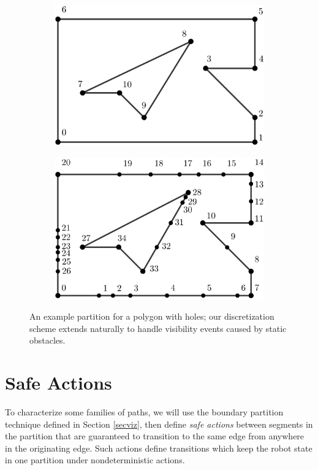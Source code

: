 \documentclass[sageh,times,Review]{sagej}
\begin{document}
\begin{figure}
\begin{subfigure}{0.5\columnwidth}
\centering
\includegraphics[width=0.9\linewidth]{median_holes.eps}
\centering
\end{subfigure}%
\begin{subfigure}{0.5\columnwidth}
\centering
\includegraphics[width=0.9\linewidth]{median_holes_inserted.eps}
\centering
\end{subfigure}
\caption{An example partition for a polygon with holes; our discretization
scheme extends naturally to handle visibility events caused by static obstacles.}
\label{fig:bvd_holes}
\end{figure}

\section{Safe Actions} \label{sec:safe}

To characterize some families of paths, we will use the boundary
partition technique defined in Section \ref{secviz}, then define
\emph{safe actions} between segments in the partition that are
guaranteed to transition to the same edge from anywhere in the
originating edge. Such actions define transitions which keep the
robot state in one partition under nondeterministic actions.
\end{document}
